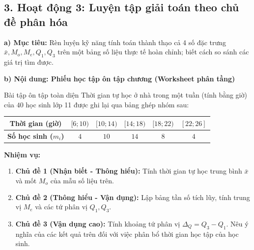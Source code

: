 \documentclass[12pt, a4paper]{article}
\begin{document}
\subsection*{3. Hoạt động 3: Luyện tập giải toán theo chủ đề phân hóa}

\noindent \textbf{a) Mục tiêu:}
Rèn luyện kỹ năng tính toán thành thạo cả 4 số đặc trưng $\bar{x}, M_o, M_e, Q_1, Q_3$ trên một bảng số liệu thực tế hoàn chỉnh; biết cách so sánh các giá trị tìm được.

\noindent \textbf{b) Nội dung: Phiếu học tập ôn tập chương (Worksheet phân tầng)}
\begin{pedabox}{Bài tập ôn tập toàn diện}
Thời gian tự học ở nhà trong một tuần (tính bằng giờ) của $40$ học sinh lớp 11 được ghi lại qua bảng ghép nhóm sau:
\begin{center}
\small
\begin{tabular}{|c|c|c|c|c|c|}
\hline
\textbf{Thời gian (giờ)} & $[6; 10)$ & $[10; 14)$ & $[14; 18)$ & $[18; 22)$ & $[22; 26]$ \\ \hline
\textbf{Số học sinh ($m_i$)} & $4$ & $10$ & $14$ & $8$ & $4$ \\ \hline
\end{tabular}
\end{center}
\textbf{Nhiệm vụ:}
\begin{enumerate}[leftmargin=0.6cm]
    \item \textbf{Chủ đề 1 (Nhận biết - Thông hiểu):} Tính thời gian tự học trung bình $\bar{x}$ và mốt $M_o$ của mẫu số liệu trên.
    \item \textbf{Chủ đề 2 (Thông hiểu - Vận dụng):} Lập bảng tần số tích lũy, tính trung vị $M_e$ và các tứ phân vị $Q_1, Q_3$.
    \item \textbf{Chủ đề 3 (Vận dụng cao):} Tính khoảng tứ phân vị $\Delta_Q = Q_3 - Q_1$. Nêu ý nghĩa của các kết quả trên đối với việc phân bổ thời gian học tập của học sinh.
\end{enumerate}
\end{pedabox}
\end{document}

